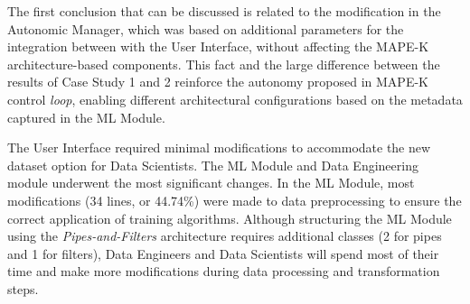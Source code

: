 \documentclass[sigconf]{acmart}
\begin{document}
\begin{table}[H]
\begin{center}
  \caption{Number of modifications performed when adding a new dataset to ML Module}
\label{tbl:ManutencaoPipelineDataset}
\end{center}
\end{table}

The first conclusion that can be discussed is related to the modification in the Autonomic Manager, which was based on additional parameters for the integration between with the User Interface, without affecting the MAPE-K architecture-based components. This fact and the large difference between the results of Case Study 1 and 2 reinforce the autonomy proposed in MAPE-K control \textit{loop}, enabling different architectural configurations based on the metadata captured in the ML Module.

The User Interface required minimal modifications to accommodate the new dataset option for Data Scientists. The ML Module and Data Engineering module underwent the most significant changes. In the ML Module, most modifications (34 lines, or 44.74\%) were made to data preprocessing to ensure the correct application of training algorithms. Although structuring the ML Module using the \textit{Pipes-and-Filters} architecture requires additional classes (2 for pipes and 1 for filters), Data Engineers and Data Scientists will spend most of their time and make more modifications during data processing and transformation steps.
\end{document}
